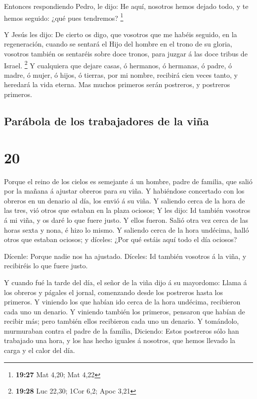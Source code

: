  Entonces respondiendo Pedro, le dijo: He aquí, nosotros
hemos dejado todo, y te hemos seguido: ¿qué pues tendremos? \footnote{\textbf{19:27}
  Mat 4,20; Mat 4,22}

 Y Jesús les dijo: De cierto os digo, que vosotros que me
habéis seguido, en la regeneración, cuando se sentará el Hijo del hombre
en el trono de su gloria, vosotros también os sentaréis sobre doce
tronos, para juzgar á las doce tribus de Israel. \footnote{\textbf{19:28}
  Luc 22,30; 1Cor 6,2; Apoc 3,21}  Y cualquiera que dejare
casas, ó hermanos, ó hermanas, ó padre, ó madre, ó mujer, ó hijos, ó
tierras, por mi nombre, recibirá cien veces tanto, y heredará la vida
eterna.  Mas muchos primeros serán postreros, y postreros
primeros.

\hypertarget{paruxe1bola-de-los-trabajadores-de-la-viuxf1a}{%
\subsection{Parábola de los trabajadores de la
viña}\label{paruxe1bola-de-los-trabajadores-de-la-viuxf1a}}

\hypertarget{section-19}{%
\section{20}\label{section-19}}

 Porque el reino de los cielos es semejante á un hombre,
padre de familia, que salió por la mañana á ajustar obreros para su
viña.  Y habiéndose concertado con los obreros en un denario
al día, los envió á su viña.  Y saliendo cerca de la hora de
las tres, vió otros que estaban en la plaza ociosos;  Y les
dijo: Id también vosotros á mi viña, y os daré lo que fuere justo. Y
ellos fueron.  Salió otra vez cerca de las horas sexta y
nona, é hizo lo mismo.  Y saliendo cerca de la hora
undécima, halló otros que estaban ociosos; y díceles: ¿Por qué estáis
aquí todo el día ociosos?

 Dícenle: Porque nadie nos ha ajustado. Díceles: Id también
vosotros á la viña, y recibiréis lo que fuere justo.

 Y cuando fué la tarde del día, el señor de la viña dijo á
su mayordomo: Llama á los obreros y págales el jornal, comenzando desde
los postreros hasta los primeros.  Y viniendo los que habían
ido cerca de la hora undécima, recibieron cada uno un denario.
 Y viniendo también los primeros, pensaron que habían de
recibir más; pero también ellos recibieron cada uno un denario.
 Y tomándolo, murmuraban contra el padre de la familia,
 Diciendo: Estos postreros sólo han trabajado una hora, y
los has hecho iguales á nosotros, que hemos llevado la carga y el calor
del día.

